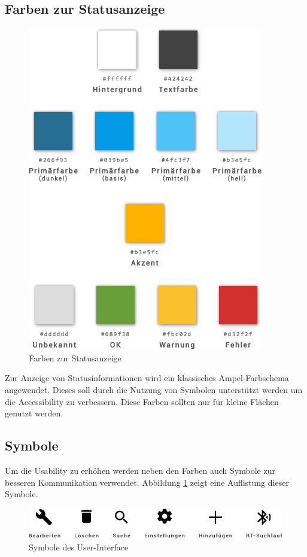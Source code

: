 \subsection{Farben zur Statusanzeige}
\label{subsec:Farben zur Statusanzeige}
\begin{figure}[H]
    \begin{center}
        \includegraphics[trim=0 0 0 420,clip,scale=0.5]{uiux/res/basic_colors}
    \end{center}
    \caption{Farben zur Statusanzeige}
\end{figure}
Zur Anzeige von Statusinformationen wird ein klassisches Ampel-Farbschema angewendet. Dieses soll durch die Nutzung von Symbolen unterstützt werden um die Accessibility zu verbessern. Diese Farben sollten nur für kleine Flächen genutzt werden.

\subsection{Symbole}
\label{subsec:Symbole}

Um die Usability zu erhöhen werden neben den Farben auch Symbole zur besseren Kommunikation verwendet. Abbildung \ref{abb:statusSymbols} zeigt eine Auflistung dieser Symbole.

\vspace{0.5cm}

\begin{figure}[H]
    \begin{center}
        \includegraphics[scale=0.5]{uiux/res/icons}
    \end{center}
    \caption{Symbole des User-Interface}
    \label{abb:statusSymbols}
\end{figure}

\pagebreak
